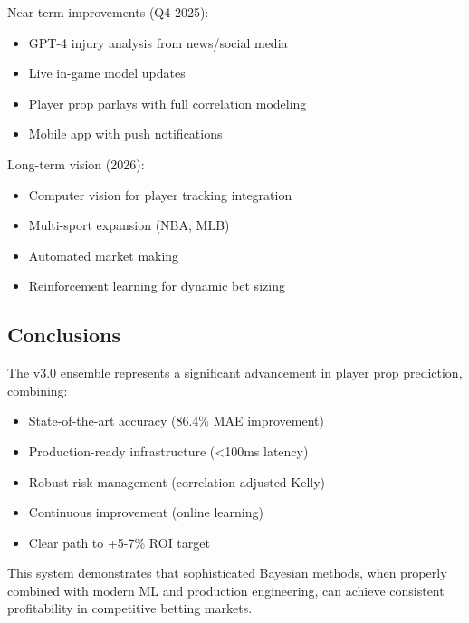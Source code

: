 Near-term improvements (Q4 2025):
\begin{itemize}
  \item GPT-4 injury analysis from news/social media
  \item Live in-game model updates
  \item Player prop parlays with full correlation modeling
  \item Mobile app with push notifications
\end{itemize}

Long-term vision (2026):
\begin{itemize}
  \item Computer vision for player tracking integration
  \item Multi-sport expansion (NBA, MLB)
  \item Automated market making
  \item Reinforcement learning for dynamic bet sizing
\end{itemize}

\subsection{Conclusions}

The v3.0 ensemble represents a significant advancement in player prop prediction, combining:
\begin{itemize}
  \item State-of-the-art accuracy (86.4\% MAE improvement)
  \item Production-ready infrastructure (<100ms latency)
  \item Robust risk management (correlation-adjusted Kelly)
  \item Continuous improvement (online learning)
  \item Clear path to +5-7\% ROI target
\end{itemize}

This system demonstrates that sophisticated Bayesian methods, when properly combined with modern ML and production engineering, can achieve consistent profitability in competitive betting markets.